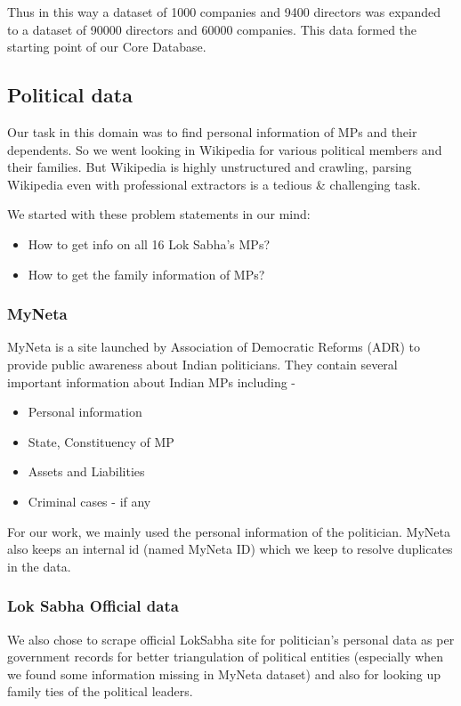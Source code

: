 Thus in this way a dataset of 1000 companies and 9400 directors was expanded to a dataset of 90000 directors and 60000 companies. This data formed the starting point of our Core Database.

\subsection{Political data}

Our task in this domain was to find personal information of MPs and their dependents. So we went looking in Wikipedia for various political members and their families. But Wikipedia is highly unstructured and crawling, parsing Wikipedia even with professional extractors is a tedious \& challenging task.

We started with these problem statements in our mind:
\begin{itemize}
    \item How to get info on all 16 Lok Sabha's MPs?
    \item How to get the family information of MPs?
\end{itemize}

\subsubsection{MyNeta}
MyNeta is a site launched by Association of Democratic Reforms (ADR) to provide public awareness about Indian politicians. They contain several important information about Indian MPs including -
\begin{itemize}
    \item Personal information
    \item State, Constituency of MP
    \item Assets and Liabilities
    \item Criminal cases - if any
\end{itemize}
For our work, we mainly used the personal information of the politician. MyNeta also keeps an internal id (named MyNeta ID) which we keep to resolve duplicates in the data.

\subsubsection{Lok Sabha Official data}

We also chose to scrape official LokSabha site for politician's personal data as per government records for better triangulation of political entities (especially when we found some information missing in MyNeta dataset) and also for looking up family ties of the political leaders.\\

